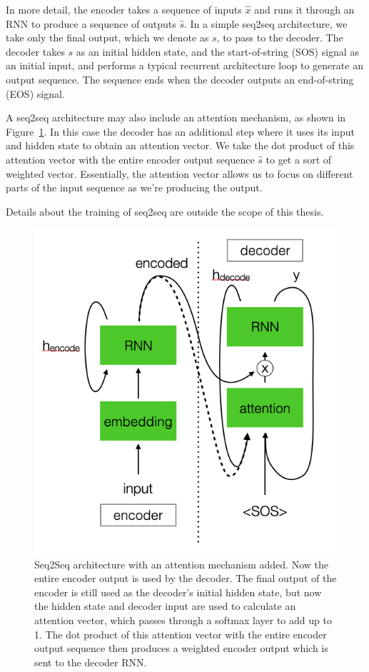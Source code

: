 In more detail, the encoder takes a sequence of inputs $\hat{x}$ and runs it through an RNN to produce a sequence of outputs $\hat{s}$. In a simple seq2seq architecture, we take only the final output, which we denote as $s$, to pass to the decoder. The decoder takes $s$ as an initial hidden state, and the start-of-string (SOS) signal as an initial input, and performs a typical recurrent architecture loop to generate an output sequence. The sequence ends when the decoder outputs an end-of-string (EOS) signal.

A seq2seq architecture may also include an attention mechanism, as shown in Figure~\ref{fig:seq2seq_with_attention}. In this case the decoder has an additional step where it uses its input and hidden state to obtain an attention vector. We take the dot product of this attention vector with the entire encoder output sequence $\hat{s}$ to get a sort of weighted vector. Essentially, the attention vector allows us to focus on different parts of the input sequence as we're producing the output.

Details about the training of seq2seq are outside the scope of this thesis.

\begin{figure}[htbp]
    \centering
    \includegraphics[width=0.55\linewidth]{Images/ML/seq2seq_with_attention.png}
    \caption{Seq2Seq architecture with an attention mechanism added. Now the entire encoder output is used by the decoder. The final output of the encoder is still used as the decoder's initial hidden state, but now the hidden state and decoder input are used to calculate an attention vector, which passes through a softmax layer to add up to 1. The dot product of this attention vector with the entire encoder output sequence then produces a weighted encoder output which is sent to the decoder RNN.}
    \label{fig:seq2seq_with_attention}
\end{figure}

